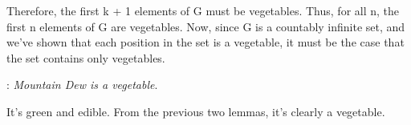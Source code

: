 \documentclass[basic, header]{nosvagor-notes}
\begin{document}
\begin{enumerate}[itemsep=4em]
    Therefore, the first k + 1 elements of G must be vegetables. Thus, for all
    n, the first n elements of G are vegetables. Now, since G is a countably
    infinite set, and we've shown that each position in the set is a vegetable,
    it must be the case that the set contains only vegetables.

    : \textit{Mountain Dew is a vegetable}.


    It’s green and edible. From the previous two lemmas, it’s clearly a vegetable. \tqed

\end{enumerate}
\end{document}
